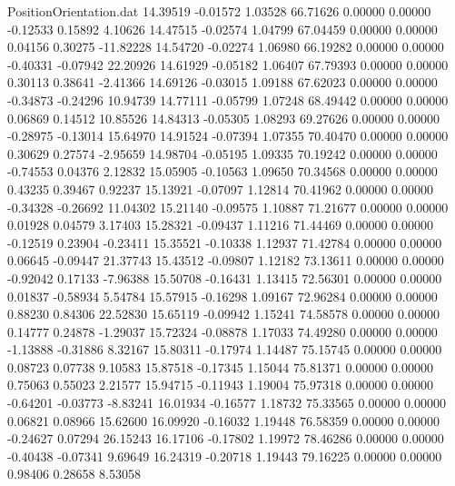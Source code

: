 \begin{filecontents}{PositionOrientation.dat}
  14.39519   -0.01572    1.03528    66.71626    0.00000    0.00000   -0.12533    0.15892    4.10626
  14.47515   -0.02574    1.04799    67.04459    0.00000    0.00000    0.04156    0.30275  -11.82228
  14.54720   -0.02274    1.06980    66.19282    0.00000    0.00000   -0.40331   -0.07942   22.20926
  14.61929   -0.05182    1.06407    67.79393    0.00000    0.00000    0.30113    0.38641   -2.41366
  14.69126   -0.03015    1.09188    67.62023    0.00000    0.00000   -0.34873   -0.24296   10.94739
  14.77111   -0.05799    1.07248    68.49442    0.00000    0.00000    0.06869    0.14512   10.85526
  14.84313   -0.05305    1.08293    69.27626    0.00000    0.00000   -0.28975   -0.13014   15.64970
  14.91524   -0.07394    1.07355    70.40470    0.00000    0.00000    0.30629    0.27574   -2.95659
  14.98704   -0.05195    1.09335    70.19242    0.00000    0.00000   -0.74553    0.04376    2.12832
  15.05905   -0.10563    1.09650    70.34568    0.00000    0.00000    0.43235    0.39467    0.92237
  15.13921   -0.07097    1.12814    70.41962    0.00000    0.00000   -0.34328   -0.26692   11.04302
  15.21140   -0.09575    1.10887    71.21677    0.00000    0.00000    0.01928    0.04579    3.17403
  15.28321   -0.09437    1.11216    71.44469    0.00000    0.00000   -0.12519    0.23904   -0.23411
  15.35521   -0.10338    1.12937    71.42784    0.00000    0.00000    0.06645   -0.09447   21.37743
  15.43512   -0.09807    1.12182    73.13611    0.00000    0.00000   -0.92042    0.17133   -7.96388
  15.50708   -0.16431    1.13415    72.56301    0.00000    0.00000    0.01837   -0.58934    5.54784
  15.57915   -0.16298    1.09167    72.96284    0.00000    0.00000    0.88230    0.84306   22.52830
  15.65119   -0.09942    1.15241    74.58578    0.00000    0.00000    0.14777    0.24878   -1.29037
  15.72324   -0.08878    1.17033    74.49280    0.00000    0.00000   -1.13888   -0.31886    8.32167
  15.80311   -0.17974    1.14487    75.15745    0.00000    0.00000    0.08723    0.07738    9.10583
  15.87518   -0.17345    1.15044    75.81371    0.00000    0.00000    0.75063    0.55023    2.21577
  15.94715   -0.11943    1.19004    75.97318    0.00000    0.00000   -0.64201   -0.03773   -8.83241
  16.01934   -0.16577    1.18732    75.33565    0.00000    0.00000    0.06821    0.08966   15.62600
  16.09920   -0.16032    1.19448    76.58359    0.00000    0.00000   -0.24627    0.07294   26.15243
  16.17106   -0.17802    1.19972    78.46286    0.00000    0.00000   -0.40438   -0.07341    9.69649
  16.24319   -0.20718    1.19443    79.16225    0.00000    0.00000    0.98406    0.28658    8.53058

\end{filecontents}
